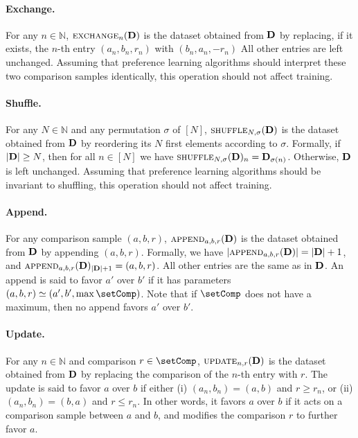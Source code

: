 \documentclass{article}
\newcommand{\card}[1]{\left\lvert{#1}\right\rvert}
\newcommand{\setN}{\mathbb N}
\DeclareMathOperator*{\append}{\textsc{append}}
\DeclareMathOperator*{\update}{\textsc{update}}
\DeclareMathOperator*{\shuffle}{\textsc{shuffle}}
\DeclareMathOperator*{\exchange}{\textsc{exchange}}
\newcommand{\bD}{{\bf D}}
\begin{document}
\paragraph{Exchange.}
For any $n \in \setN$, $\exchange_n(\bD)$ is the dataset obtained from $\bD$ by replacing, if it exists, the $n$-th entry $(a_n, b_n, r_n)$ with $(b_n, a_n, - r_n)$
All other entries are left unchanged.
Assuming that preference learning algorithms should interpret 
these two comparison samples identically,
this operation should not affect training.


\paragraph{Shuffle.}
For any $N \in \setN$ and any permutation $\sigma$ of $[N]$, 
$\shuffle_{N, \sigma}(\bD)$ is the dataset obtained from $\bD$ by reordering its $N$ first elements according to $\sigma$.
Formally, if $\card{\bD} \geq N$, then for all $n \in [N]$ we have $\shuffle_{N, \sigma} (\bD)_n = \bD_{\sigma(n)}$.
Otherwise, $\bD$ is left unchanged.
Assuming that preference learning algorithms should be invariant to shuffling,
this operation should not affect training.

\paragraph{Append.}
For any comparison sample $(a, b, r)$,
$\append_{a,b, r} (\bD)$ is the dataset obtained from $\bD$ by appending $(a, b, r)$.
Formally, we have $\card{\append_{a,b,r} (\bD)} = \card{\bD} + 1$, and $\append_{a,b,r} (\bD)_{\card{\bD} + 1} = (a, b, r)$.
All other entries are the same as in $\bD$.
An append is said to  favor $a'$ over $b'$ 
if it has parameters $(a, b, r) \simeq (a', b', \max \setComp)$.
Note that if $\setComp$ does not have a maximum,
then no append  favors $a'$ over $b'$. 

\paragraph{Update.}
For any $n \in \setN$ and comparison $r \in \setComp$,
$\update_{n, r} (\bD)$ is the dataset obtained from $\bD$ by replacing the comparison of the $n$-th entry with $r$.
The update is said to favor $a$ over $b$ if either (i) $(a_n, b_n) = (a, b)$ and $r \geq r_n$, or (ii) $(a_n, b_n) = (b, a)$ and $r \leq r_n$.
In other words, it favors $a$ over $b$
if it acts on a comparison sample between $a$ and $b$,
and modifies the comparison $r$ to further favor $a$.
\end{document}
